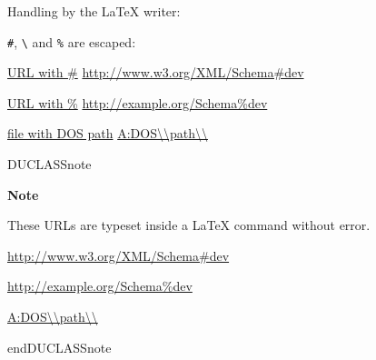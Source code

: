 \documentclass[a4paper]{article}
\newenvironment{DUclass}[1]%
    {%
     \def\DocutilsClassFunctionName{DUCLASS#1}
     \csname \DocutilsClassFunctionName \endcsname}%
    {\csname end\DocutilsClassFunctionName \endcsname}%
\newenvironment{DUadmonition}%
    {\begin{center}
       \begin{lrbox}{\DUadmonitionbox}
         \begin{minipage}{0.9\linewidth}
    }%
    {    \end{minipage}
       \end{lrbox}
       \fbox{\usebox{\DUadmonitionbox}}
     \end{center}
    }
\newenvironment{DUlineblock}[1]{%
    \list{}{\setlength{\partopsep}{\parskip}
            \addtolength{\partopsep}{\baselineskip}
            \setlength{\topsep}{0pt}
            \setlength{\itemsep}{0.15\baselineskip}
            \setlength{\parsep}{0pt}
            \setlength{\leftmargin}{#1}}
    \raggedright
  }
  {\endlist}
\providecommand*{\DUtitle}[1]{%
  \smallskip\noindent\textbf{#1}\smallskip}
\begin{document}
Handling by the LaTeX writer:

\begin{itemize}
\item \texttt{\#}, \texttt{\textbackslash{}} and \texttt{\%} are escaped:

\begin{DUlineblock}{0em}
\item[] \href{http://www.w3.org/XML/Schema\#dev}{URL with \#}
\url{http://www.w3.org/XML/Schema\#dev}
\item[] \href{http://www.w3.org/XML/Schema\%dev}{URL with \%}
\url{http://example.org/Schema\%dev}
\item[] \href{A:DOS\\path\\}{file with DOS path} \url{A:DOS\\path\\}
\end{DUlineblock}

\begin{DUclass}{note}
\begin{DUadmonition}
\DUtitle{Note}

These URLs are typeset inside a LaTeX command without error.

\begin{DUlineblock}{0em}
\item[] \url{http://www.w3.org/XML/Schema\#dev}
\item[] \url{http://example.org/Schema\%dev}
\item[] \url{A:DOS\\path\\}
\end{DUlineblock}
\end{DUadmonition}
\end{DUclass}
\end{itemize}
\end{document}
